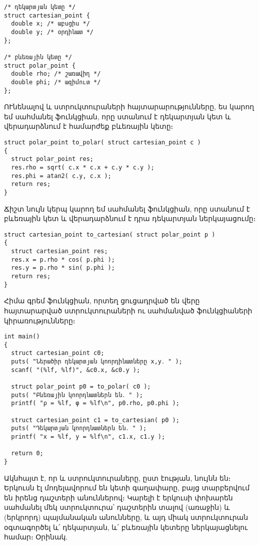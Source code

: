 \begin{Verbatim}
/* դեկարտյան կետը */
struct cartesian_point {
  double x; /* աբսցիս */
  double y; /* օրդինատ */
};

/* բևեռային կետը */
struct polar_point {
  double rho; /* շառավիղ */
  double phi; /* ազիմուտ */
};
\end{Verbatim}

ՈՒնենալով  և  ստրուկտուրաների
հայտարարությունները, ես կարող եմ սահմանել  ֆունկցիան, որը
ստանում է դեկարտյան կետ և վերադարձնում է համարժեք բևեռային կետը։

\begin{Verbatim}
struct polar_point to_polar( struct cartesian_point c )
{
  struct polar_point res;
  res.rho = sqrt( c.x * c.x + c.y * c.y );
  res.phi = atan2( c.y, c.x );
  return res;
}
\end{Verbatim}

Ճիշտ նույն կերպ կարող եմ սահմանել  ֆունկցիան, որը
ստանում է բևեռային կետ և վերադարձնում է դրա դեկարտյան ներկայացումը։

\begin{Verbatim}
struct cartesian_point to_cartesian( struct polar_point p )
{
  struct cartesian_point res;
  res.x = p.rho * cos( p.phi );
  res.y = p.rho * sin( p.phi );
  return res;
}
\end{Verbatim}

Հիմա գրեմ  ֆունկցիան, որտեղ ցուցադրված են վերը հայտարարված
ստրուկտուրաների ու սահմանված ֆունկցիաների կիրառությունները։

\begin{Verbatim}
int main()
{
  struct cartesian_point c0;
  puts( "Ներածիր դեկարտյան կոորդինատները x,y․ " );
  scanf( "(%lf, %lf)", &c0.x, &c0.y );

  struct polar_point p0 = to_polar( c0 );
  puts( "Բևեռային կոորդնատներն են․ " );
  printf( "ρ = %lf, φ = %lf\n", p0.rho, p0.phi );

  struct cartesian_point c1 = to_cartesian( p0 );
  puts( "Դեկարտյան կոորդնատներն են․ " );
  printf( "x = %lf, y = %lf\n", c1.x, c1.y );

  return 0;
}
\end{Verbatim}

Ակնհայտ է, որ  և  ստրուկտուրաները,
ըստ էության, նույնն են։ Երկուսն էլ մոդելավորում են կետի գաղափարը, բայց
տարբերվում են իրենց դաշտերի անուններով։ Կարելի է երկուսի փոխարեն սահմանել
մեկ  ստրուկտուրա՝ դաշտերին տալով  (առաջին) և
 (երկրորդ) պայմանական անունները, և այդ միակ ստրուկտուրան
օգտագործել և՛ դեկարտյան, և՛ բևեռային կետերը ներկայացնելու համար։ Օրինակ.

